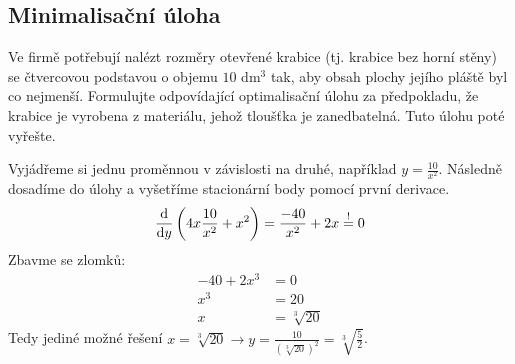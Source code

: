 \subsection{Minimalisační úloha}
Ve firmě potřebují nalézt rozměry otevřené krabice (tj. krabice bez horní stěny) se čtvercovou podstavou o objemu $10$
d$\text{m}^3$ tak, aby obsah plochy jejího pláště byl co nejmenší. Formulujte odpovídající optimalisační úlohu za
předpokladu, že krabice je vyrobena z materiálu, jehož tloušťka je zanedbatelná. Tuto úlohu poté vyřešte.

\begin{center}
\end{center}
Vyjádřeme si jednu proměnnou v závislosti na druhé, například $y = \frac{10}{x^2}$. Následně dosadíme do úlohy a vyšetříme
stacionární body pomocí první derivace.
\[
    \frac{\mathop{}\!\mathrm{d}}{\mathop{}\!\mathrm{d} y} \left(4x \frac{10}{x^2} + x^2\right)= \frac{-40}{x^2} + 2x \stackrel{!}{=} 0
\]
Zbavme se zlomků:
\begin{align*}
    -40 + 2x^3 &= 0 \\
    x^3 &= 20  \\
    x &= \sqrt[3]{20}
\end{align*}
Tedy jediné možné řešení $x = \sqrt[3]{20} \rightarrow y = \frac{10}{\left(\sqrt[3]{20}\right)^2} =  \sqrt[3]{\frac{5}{2}}$.

%
